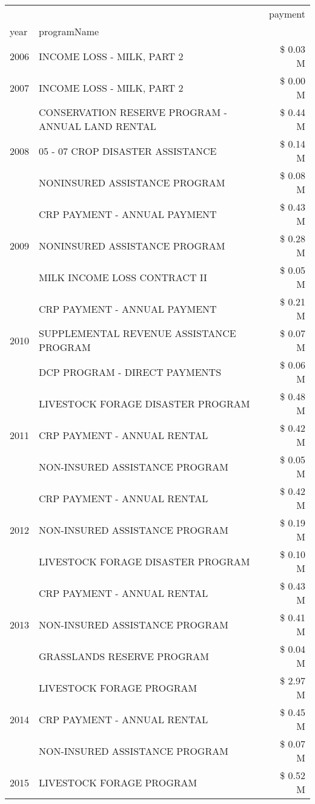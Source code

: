 \begin{tabular}{llr}
\toprule
 &  & payment \\
year & programName &  \\
\midrule
2006 & INCOME LOSS - MILK, PART 2 & \$ 0.03 M \\
\cline{1-3}
2007 & INCOME LOSS - MILK, PART 2 & \$ 0.00 M \\
\cline{1-3}
\multirow[t]{3}{*}{2008} & CONSERVATION RESERVE PROGRAM - ANNUAL LAND RENTAL & \$ 0.44 M \\
 & 05 - 07 CROP DISASTER ASSISTANCE & \$ 0.14 M \\
 & NONINSURED ASSISTANCE PROGRAM & \$ 0.08 M \\
\cline{1-3}
\multirow[t]{3}{*}{2009} & CRP PAYMENT - ANNUAL PAYMENT & \$ 0.43 M \\
 & NONINSURED ASSISTANCE PROGRAM & \$ 0.28 M \\
 & MILK INCOME LOSS CONTRACT II & \$ 0.05 M \\
\cline{1-3}
\multirow[t]{3}{*}{2010} & CRP PAYMENT - ANNUAL PAYMENT & \$ 0.21 M \\
 & SUPPLEMENTAL REVENUE ASSISTANCE PROGRAM & \$ 0.07 M \\
 & DCP PROGRAM - DIRECT PAYMENTS & \$ 0.06 M \\
\cline{1-3}
\multirow[t]{3}{*}{2011} & LIVESTOCK FORAGE DISASTER PROGRAM & \$ 0.48 M \\
 & CRP PAYMENT - ANNUAL RENTAL & \$ 0.42 M \\
 & NON-INSURED ASSISTANCE PROGRAM & \$ 0.05 M \\
\cline{1-3}
\multirow[t]{3}{*}{2012} & CRP PAYMENT - ANNUAL RENTAL & \$ 0.42 M \\
 & NON-INSURED ASSISTANCE PROGRAM & \$ 0.19 M \\
 & LIVESTOCK FORAGE DISASTER PROGRAM & \$ 0.10 M \\
\cline{1-3}
\multirow[t]{3}{*}{2013} & CRP PAYMENT - ANNUAL RENTAL & \$ 0.43 M \\
 & NON-INSURED ASSISTANCE PROGRAM & \$ 0.41 M \\
 & GRASSLANDS RESERVE PROGRAM & \$ 0.04 M \\
\cline{1-3}
\multirow[t]{3}{*}{2014} & LIVESTOCK FORAGE PROGRAM & \$ 2.97 M \\
 & CRP PAYMENT - ANNUAL RENTAL & \$ 0.45 M \\
 & NON-INSURED ASSISTANCE PROGRAM & \$ 0.07 M \\
\cline{1-3}
\multirow[t]{3}{*}{2015} & LIVESTOCK FORAGE PROGRAM & \$ 0.52 M \\

\end{tabular}
